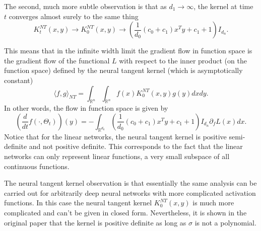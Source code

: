 The second, much more subtle observation is that as $d_1\rightarrow \infty$, the kernel at time $t$ converges almost surely to the same thing
\begin{equation}
 K^{NT}_t(x,y) \rightarrow K^{NT}_0(x,y) \rightarrow \left(\frac{1}{d_0}\left(c_0 + c_1\right)x^Ty + c_1 + 1\right)I_{d_n}.
\end{equation}

This means that in the infinite width limit the gradient flow in function space is the gradient flow of the functional $L$ with respect to the inner product (on the function space) defined by the neural tangent kernel (which is asymptotically constant)
\begin{equation}
 \langle f, g\rangle_{NT} = \int_{\mathbb{R}^n}\int_{\mathbb{R}^n} f(x)K^{NT}_0(x,y)g(y) dx dy.
\end{equation}
In other words, the flow in function space is given by
\begin{equation}
 \left(\frac{d}{dt}f(\cdot,\Theta_t)\right)(y) = -\int_{\mathbb{R}^{d_0}} \left(\frac{1}{d_0}\left(c_0 + c_1\right)x^Ty + c_1 + 1\right)I_{d_n}\partial_fL(x) dx.
\end{equation}
Notice that for the linear networks, the neural tangent kernel is positive semi-definite and not positive definite. This corresponds to the fact that the linear networks can only represent linear functions, a very small subspace of all continuous functions.

The neural tangent kernel observation is that essentially the same analysis can be carried out for arbitrarily deep neural networks with more complicated activation functions. In this case the neural tangent kernel $K^{NT}_0(x,y)$ is much more complicated and can't be given in closed form. Nevertheless, it is shown in the original paper that the kernel is positive definite as long as $\sigma$ is not a polynomial.



